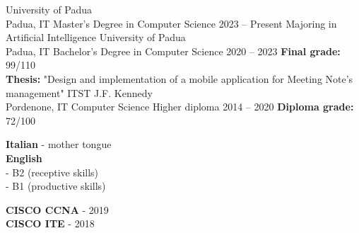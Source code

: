 \documentclass[9pt]{developercv} %
\begin{document}

\begin{entrylist}
	\entry
		{University of Padua\\\footnotesize{Padua, IT}}
		{Master's Degree in Computer Science}
		{2023 -- Present}
		{Majoring in Artificial Intelligence}
	\entry
		{University of Padua\\\footnotesize{Padua, IT}}
		{Bachelor's Degree in Computer Science}
		{2020 -- 2023}
		{\textbf{Final grade:} 99/110 \\
		\textbf{Thesis:} "Design and implementation of a mobile application for Meeting Note's management"}
	\entry
		{ITST J.F. Kennedy\\\footnotesize{Pordenone, IT}}
		{Computer Science Higher diploma}
		{2014 -- 2020}
		{\textbf{Diploma grade:} 72/100}
\end{entrylist}


\begin{minipage}[t]{0.3\textwidth}
	\vspace{-\baselineskip} %

	
	\textbf{Italian} - mother tongue \\
	\textbf{English} \\
	- B2 (receptive skills) \\
	- B1 (productive skills)
\end{minipage}
\hfill
\begin{minipage}[t]{0.3\textwidth}
	\vspace{-\baselineskip} %
	
	
	\textbf{CISCO CCNA} - 2019 \\
	\textbf{CISCO ITE} - 2018	
\end{minipage}

\end{document}
